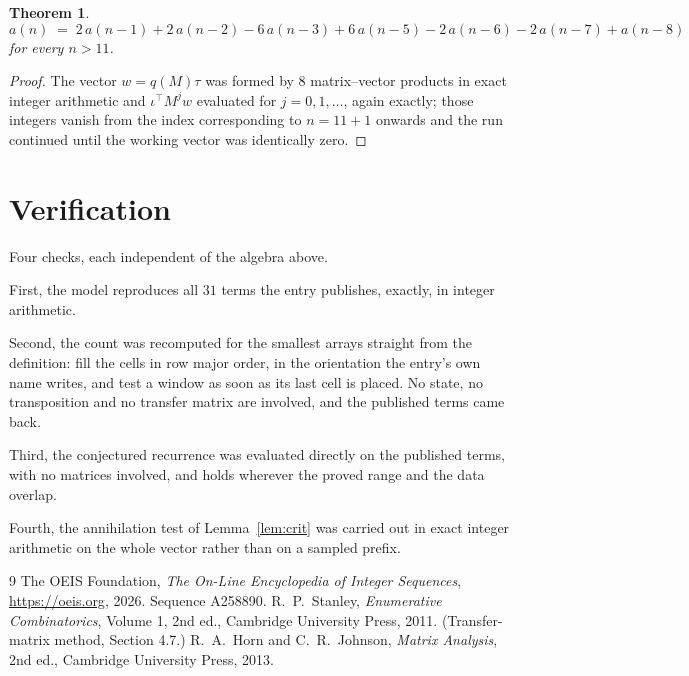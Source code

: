 \documentclass[11pt,a4paper]{article}
\theoremstyle{plain}
\newtheorem{theorem}{Theorem}
\theoremstyle{definition}
\begin{document}
\begin{theorem}
\[
a(n)\;=\;2\,a(n-1) + 2\,a(n-2) - 6\,a(n-3) + 6\,a(n-5) - 2\,a(n-6) - 2\,a(n-7) + a(n-8)
\]
for every $n>11$.
\end{theorem}

\begin{proof}
The vector $w=q(M)\tau$ was formed by $8$ matrix--vector products in exact integer
arithmetic and $\iota^{\!\top}M^{j}w$ evaluated for $j=0,1,\dots$, again exactly; those
integers vanish from the index corresponding to $n=11+1$ onwards and the run continued
until the working vector was identically zero.
\end{proof}

\section{Verification}

Four checks, each independent of the algebra above.

First, the model reproduces all $31$ terms the entry publishes, exactly, in integer
arithmetic.

Second, the count was recomputed for the smallest arrays straight from the definition: fill the
cells in row major order, in the orientation the entry's own name writes, and test a window as
soon as its last cell is placed. No state, no transposition and no transfer matrix are
involved, and the published terms came back.

Third, the conjectured recurrence was evaluated directly on the published terms, with no
matrices involved, and holds wherever the proved range and the data overlap.

Fourth, the annihilation test of Lemma~\ref{lem:crit} was carried out in exact integer
arithmetic on the whole vector rather than on a sampled prefix.

\begin{thebibliography}{9}
 The OEIS Foundation, \emph{The On-Line Encyclopedia of Integer
Sequences}, \url{https://oeis.org}, 2026. Sequence A258890.
 R.~P.~Stanley, \emph{Enumerative Combinatorics}, Volume 1, 2nd ed.,
Cambridge University Press, 2011. (Transfer-matrix method, Section 4.7.)
 R.~A.~Horn and C.~R.~Johnson, \emph{Matrix Analysis}, 2nd ed., Cambridge
University Press, 2013.
\end{thebibliography}
\end{document}

